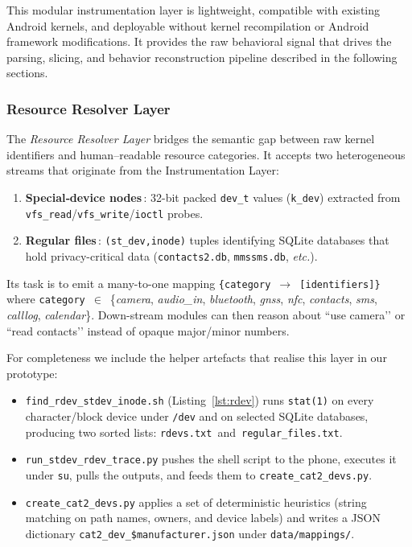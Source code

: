 \documentclass[a4paper,12pt]{report}
\begin{document}
This modular instrumentation layer is lightweight, compatible with existing Android kernels, and deployable without kernel recompilation or Android framework modifications. It provides the raw behavioral signal that drives the parsing, slicing, and behavior reconstruction pipeline described in the following sections.


\subsubsection{Resource Resolver Layer}

The \emph{Resource Resolver Layer} bridges the semantic gap between
raw kernel identifiers and human–readable resource categories.  It
accepts two heterogeneous streams that originate from the
Instrumentation Layer:

\begin{enumerate}
  \item \textbf{Special‐device nodes}\,: 32-bit packed
        \texttt{dev\_t} values (\texttt{k\_dev}) extracted from
        \texttt{vfs\_read}/\texttt{vfs\_write}/\texttt{ioctl} probes.
  \item \textbf{Regular files}\,: \texttt{(st\_dev,\;inode)} tuples
        identifying SQLite databases that hold privacy-critical data
        (\texttt{contacts2.db}, \texttt{mmssms.db}, \textit{etc.}).
\end{enumerate}

Its task is to emit a many-to-one mapping
\texttt{\{category $\rightarrow$ [identifiers]\}} where
\texttt{category}~$\in$~\{\textit{camera}, \textit{audio\_in},
\textit{bluetooth}, \textit{gnss}, \textit{nfc},
\textit{contacts}, \textit{sms}, \textit{calllog},
\textit{calendar}\}.
Down-stream modules can then reason about ``use camera’’ or ``read
contacts’’ instead of opaque major/minor numbers.

For completeness we include the helper artefacts that realise this
layer in our prototype:

\begin{itemize}
  \item \texttt{find\_rdev\_stdev\_inode.sh} (Listing~\ref{lst:rdev})
        runs \texttt{stat(1)} on every character/block device under
        \texttt{/dev} and on selected SQLite databases, producing two
        sorted lists:
        \texttt{rdevs.txt}~and~\texttt{regular\_files.txt}.
  \item \texttt{run\_stdev\_rdev\_trace.py} pushes the shell script to
        the phone, executes it under \texttt{su}, pulls the outputs,
        and feeds them to
        \texttt{create\_cat2\_devs.py}.
  \item \texttt{create\_cat2\_devs.py} applies a set of deterministic
        heuristics (string matching on path names, owners, and device
        labels) and writes a JSON dictionary
        \texttt{cat2\_dev\_\$manufacturer.json} under
        \texttt{data/mappings/}.
\end{itemize}
\end{document}
